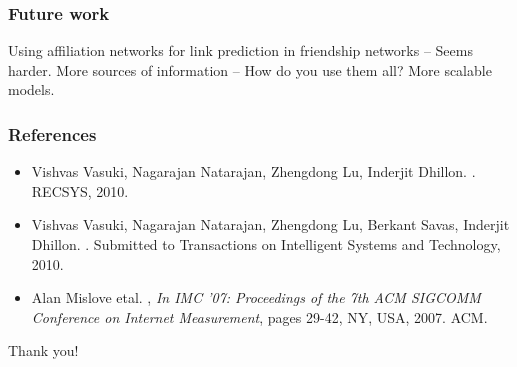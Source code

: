 \documentclass{beamer}
\begin{document}
\begin{frame}
\frametitle{Future work}
\begin{itemize}
\pitem Using affiliation networks for link prediction in friendship networks -- Seems harder.
\pitem More sources of information -- How do you use them all?
\pitem More scalable models.
\end{itemize}
\end{frame}

\begin{frame}
\frametitle{References}
\begin{itemize}
\item Vishvas Vasuki, Nagarajan Natarajan, Zhengdong Lu, Inderjit Dhillon. . RECSYS, 2010.
\item Vishvas Vasuki, Nagarajan Natarajan, Zhengdong Lu, Berkant Savas, Inderjit Dhillon. . Submitted to Transactions on Intelligent Systems and Technology, 2010.
\item Alan Mislove etal. , \emph{In IMC '07: Proceedings of the 7th ACM SIGCOMM Conference on Internet Measurement}, pages 29-42, NY, USA, 2007. ACM.
\end{itemize}
\end{frame}

\begin{frame}{}
  \hspace{1.1in}
  \centerline{\huge{Thank you!}}
\end{frame}

%
%

%
\end{document}
